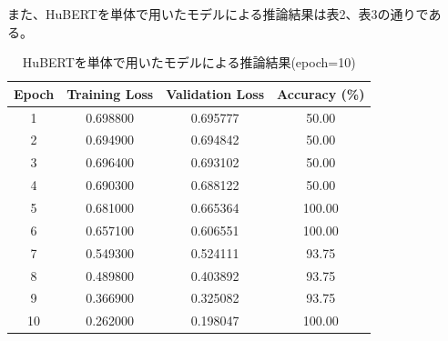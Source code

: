 \documentclass[10pt]{ltjsarticle}
\begin{document}
また、HuBERTを単体で用いたモデルによる推論結果は表2、表3の通りである。
\vspace{10pt}
\begin{table}[h]
\centering
\caption{HuBERTを単体で用いたモデルによる推論結果(epoch=10)}
\begin{tabular}{cccc}
\toprule
Epoch & Training Loss & Validation Loss & Accuracy (\%) \\
\midrule
1  & 0.698800 & 0.695777 & 50.00 \\
2  & 0.694900 & 0.694842 & 50.00 \\
3  & 0.696400 & 0.693102 & 50.00 \\
4  & 0.690300 & 0.688122 & 50.00 \\
5  & 0.681000 & 0.665364 & 100.00 \\
6  & 0.657100 & 0.606551 & 100.00 \\
7  & 0.549300 & 0.524111 & 93.75 \\
8  & 0.489800 & 0.403892 & 93.75 \\
9  & 0.366900 & 0.325082 & 93.75 \\
10 & 0.262000 & 0.198047 & 100.00 \\
\bottomrule
\end{tabular}
\end{table}
\end{document}
